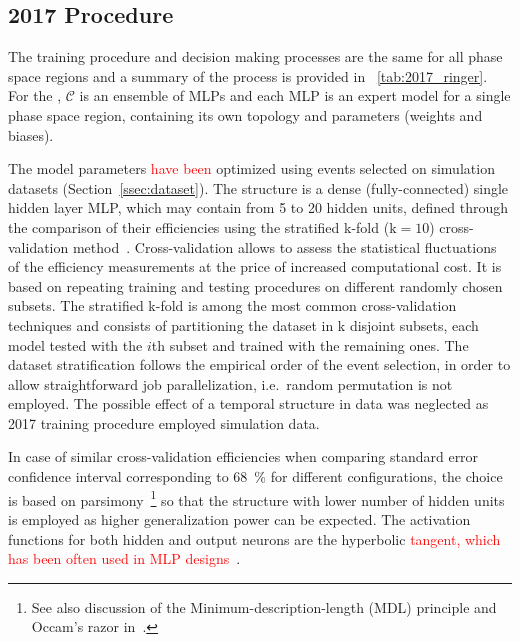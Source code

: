 \subsection{2017 Procedure}\label{ssec:2017}

The training procedure and decision making processes are the same for all phase
space regions and a summary of the process is provided in
\tablename~\ref{tab:2017_ringer}. For the \rnn{}, $\mathcal{C}$ is an ensemble of
MLPs and each MLP is an expert model for a single phase space
region, containing its own topology and parameters (weights and biases).

The model parameters \textcolor{red}{have been} optimized using events selected on simulation datasets
(Section~\ref{ssec:dataset}). The structure is a dense (fully-connected) single
hidden layer MLP, which may contain from 5 to 20 hidden units, defined through
the comparison of their efficiencies using the stratified k-fold ($\text{k}=10$)
cross-validation method~\cite{haykin_2008}. Cross-validation allows to assess the statistical fluctuations of the efficiency measurements 
at the price of increased computational cost. It is
based on repeating training and testing procedures on different
randomly chosen subsets. The stratified k-fold is
among the most common cross-validation techniques and consists of partitioning
the dataset in k disjoint subsets, each model tested with the $i$th subset and
trained with the remaining ones. The dataset stratification follows the
empirical order of the event selection, in order to allow straightforward job
parallelization, i.e.\ random permutation is not employed. The possible effect
of a temporal structure in data was neglected as 2017 training procedure
employed simulation data.

In case of similar cross-validation efficiencies when comparing standard
error confidence interval corresponding to \SI{68}{\%} for different
configurations, the choice is based on
parsimony~\cite{medeiros2001statistical}\footnote{See also discussion of the
  Minimum-description-length (MDL) principle and Occam's razor
in~\cite{haykin_2008}.} so that the structure with lower number of hidden units
is employed as higher generalization power can be expected. The activation
functions for both hidden and output neurons are the hyperbolic \textcolor{red}{tangent, which has been often used in MLP designs~\cite{haykin_2008}}.






